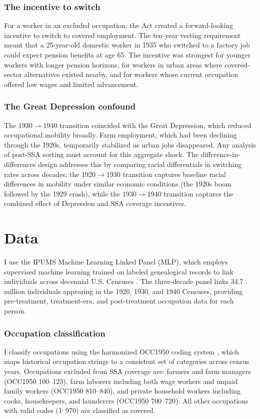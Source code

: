 \documentclass[12pt]{article}
\begin{document}
\subsubsection*{The incentive to switch} For a worker in an excluded occupation, the Act created a forward-looking incentive to switch to covered employment. The ten-year vesting requirement meant that a 25-year-old domestic worker in 1935 who switched to a factory job could expect pension benefits at age 65. The incentive was strongest for younger workers with longer pension horizons, for workers in urban areas where covered-sector alternatives existed nearby, and for workers whose current occupation offered low wages and limited advancement.

\subsubsection*{The Great Depression confound} The 1930$\to$1940 transition coincided with the Great Depression, which reduced occupational mobility broadly. Farm employment, which had been declining through the 1920s, temporarily stabilized as urban jobs disappeared. Any analysis of post-SSA sorting must account for this aggregate shock. The difference-in-differences design addresses this by comparing racial differentials in switching rates across decades: the 1920$\to$1930 transition captures baseline racial differences in mobility under similar economic conditions (the 1920s boom followed by the 1929 crash), while the 1930$\to$1940 transition captures the combined effect of Depression and SSA coverage incentives.


\section{Data}

I use the IPUMS Machine Learning Linked Panel (MLP), which employs supervised machine learning trained on labeled genealogical records to link individuals across decennial U.S. Censuses \citep{price2020, ruggles2024}. The three-decade panel links 34.7 million individuals appearing in the 1920, 1930, and 1940 Censuses, providing pre-treatment, treatment-era, and post-treatment occupation data for each person.

\subsubsection*{Occupation classification} I classify occupations using the harmonized OCC1950 coding system \citep{ruggles2024}, which maps historical occupation strings to a consistent set of categories across census years. Occupations excluded from SSA coverage are: farmers and farm managers (OCC1950 100--123), farm laborers including both wage workers and unpaid family workers (OCC1950 810--840), and private household workers including cooks, housekeepers, and launderers (OCC1950 700--720). All other occupations with valid codes (1--970) are classified as covered.
\end{document}
